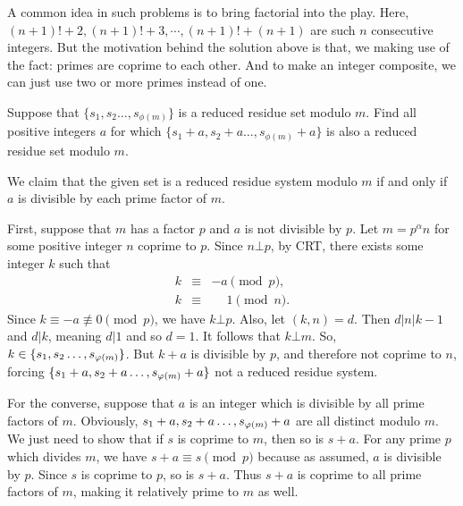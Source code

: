 \documentclass{subfile}
\begin{document}
		\begin{note}
			A common idea in such problems is to bring factorial into the play. Here, $(n+1)!+2,(n+1)!+3,\cdots,(n+1)!+(n+1)$ are such $n$ consecutive integers. But the motivation behind the solution above is that, we making use of the fact: primes are coprime to each other. And to make an integer composite, we can just use two or more primes instead of one.
		\end{note}
		
		\begin{problem}
			Suppose that $ \{s_1,s_2\ldots , s_{\phi(m)}\} $ is a reduced residue set modulo $m$. Find all positive integers $a$ for which $ \{s_1+a,s_2+a\ldots , s_{\phi(m)}+a\} $ is also a reduced residue set modulo $m$.
		\end{problem}
		
		\begin{solution}
			We claim that the given set is a reduced residue system modulo $m$ if and only if $a$ is divisible by each prime factor of $m$. 
			
			First, suppose that $m$ has a factor $p$ and $a$ is not divisible by $p$. Let $m=p^{\alpha}n$ for some positive integer $n$ coprime to $p$. Since $n \bot p$, by CRT, there exists some integer $k$ such that
				\begin{eqnarray*}
				k &\equiv& -a \pmod p,\\
				k &\equiv& \phantom{-}1  \pmod n.
				\end{eqnarray*}
			Since $k \equiv -a \not \equiv 0 \pmod p$, we have $k \bot p$. Also, let $(k,n)=d$. Then $d|n|k-1$ and $d|k$, meaning $d|1$ and so $d=1$. It follows that $k \bot m$. So, $k \in \{s_1,s_2\ldots , s_{\varphi(m)}\} $. But $k+a$ is divisible by $p$, and therefore not coprime to $n$, forcing $ \{s_1+a,s_2+a\ldots , s_{\varphi(m)}+a\} $ not a reduced residue system.
			
			For the converse, suppose that $a$ is an integer which is divisible by all prime factors of $m$. Obviously, $s_1+a,s_2+a\ldots , s_{\varphi(m)}+a$ are all distinct modulo $m$. We just need to show that if $s$ is coprime to $m$, then so is $s+a$. For any prime $p$ which divides $m$, we have $s+a \equiv s \pmod p$ because as assumed, $a$ is divisible by $p$. Since $s$ is coprime to $p$, so is $s+a$. Thus $s+a$ is coprime to all prime factors of $m$, making it relatively prime to $m$ as well. 
		\end{solution}
		
\end{document}
